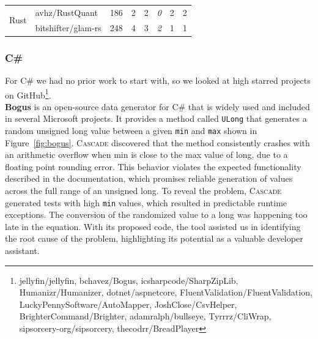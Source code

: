 \documentclass[acmsmall, screen]{acmart}
\newcommand{\tool}{\textsc{Cascade}\xspace}
\begin{document}
\begin{table}[tb]
\begin{tabular}{@{}llrccccc@{}}
\multirow{2}{*}{Rust}     & avhz/RustQuant                  & 186                      & 2                                       & 2                         & \textit{0}                & 2                                & 2                        \\
                          & bitshifter/glam-rs              & 248                      & 4                                       & 3                         & \textit{2}                & 1                                & 1                        \\ \bottomrule
\end{tabular}
\end{table}

\subsubsection*{\textbf{C\#}}
For C\# we had no prior work to start with, so we looked at high starred projects on GitHub\footnote{jellyfin/jellyfin, 
bchavez/Bogus, 
icsharpcode/SharpZipLib, 
Humanizr/Humanizer, 
dotnet/aspnetcore, 
FluentValidation/FluentValidation, 
LuckyPennySoftware/AutoMapper, 
JoshClose/CsvHelper, 
BrighterCommand/Brighter, 
adamralph/bullseye, 
Tyrrrz/CliWrap, 
sipsorcery-org/sipsorcery,
thecodrr/BreadPlayer}.
\\\textbf{Bogus} is an open-source data generator for C\# that is widely used and included in several Microsoft projects. It provides a method called \texttt{ULong} that generates a random unsigned long value between a given \texttt{min} and \texttt{max} shown in Figure~\ref{fig:bogus}.
\tool discovered that the method consistently crashes with an arithmetic overflow when min is close to the max value of long, due to a floating point rounding error.
This behavior violates the expected functionality described in the documentation, which promises reliable generation of values across the full range of an unsigned long.
To reveal the problem, \tool generated tests with high \texttt{min} values, which resulted in predictable runtime exceptions. The conversion of the randomized value to a long was happening too late in the equation. With its proposed code, the tool assisted us in identifying the root cause of the problem, highlighting its potential as a valuable developer assistant.
\end{document}

